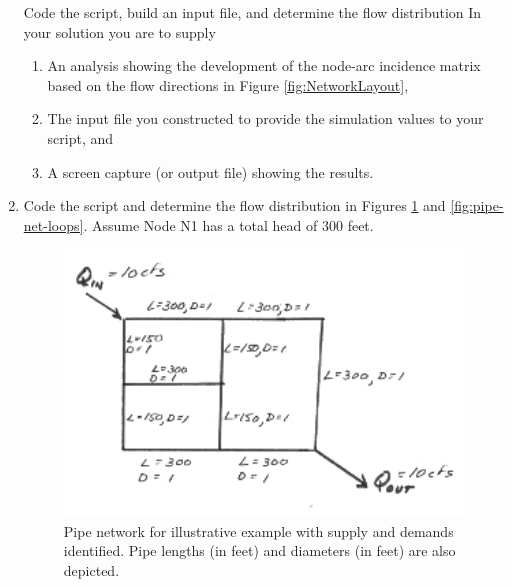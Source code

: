 \begin{enumerate}
Code the script, build an input file, and determine the flow distribution
In your solution you are to supply
\begin{enumerate}
\item An analysis showing the development of the node-arc incidence matrix based on the flow directions in Figure \ref{fig:NetworkLayout},
\item The input file you constructed to provide the simulation values to your script, and
\item A screen capture (or output file) showing the results.
\end{enumerate}


\item Code the script and determine the flow distribution in Figures \ref{fig:pipe-net} and \ref{fig:pipe-net-loops}.  Assume Node N1 has a total head of 300 feet. 

\begin{figure}[h!] %
   \centering
   \includegraphics[width=4.5in]{./8-PipeNetworkHydraulics/pipe-net.jpg} 
   \caption{Pipe network for illustrative example with supply and demands identified.  Pipe lengths (in feet) and diameters (in feet) are also depicted.}
   \label{fig:pipe-net}
\end{figure}


\end{enumerate}
